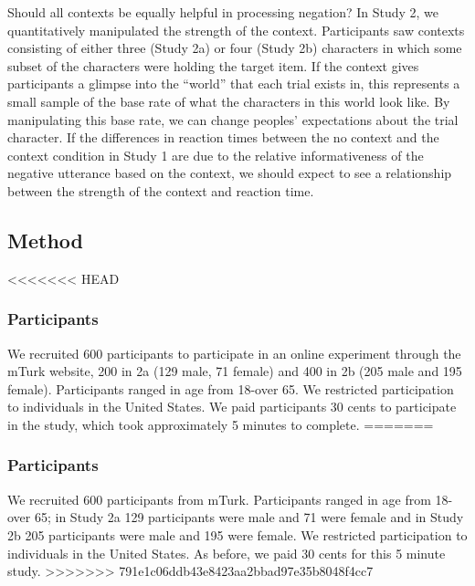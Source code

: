\documentclass[10pt,letterpaper]{article}
\begin{document}
Should all contexts be equally helpful in processing negation? 
In Study 2, we quantitatively manipulated the strength of the context.  Participants saw contexts consisting of either three (Study 2a) or four (Study 2b) characters in which some subset of the characters were holding the target item.  If the context gives participants a glimpse into the ``world'' that each trial exists in, this represents a small sample of the base rate of what the characters in this world look like.  By manipulating this base rate, we can change peoples' expectations about the trial character.  If the differences in reaction times between the no context and the context condition in Study 1 are due to the relative informativeness of the negative utterance based on the context, we should expect to see a relationship between the strength of the context and reaction time. 

\subsection{Method}

<<<<<<< HEAD
\subsubsection{Participants } 
We recruited 600 participants to participate in an online experiment through the mTurk website, 200 in 2a (129 male, 71 female) and  400 in 2b (205 male and 195 female). Participants ranged in age from 18-over 65.  We restricted participation to individuals in the United States. We paid participants 30 cents to participate in the study, which took approximately 5 minutes to complete.  
=======
\subsubsection{Participants} 

We recruited 600 participants from mTurk. Participants ranged in age from 18-over 65; in Study 2a 129 participants were male and 71 were female and in Study 2b 205 participants were male and 195 were female.  We restricted participation to individuals in the United States. As before, we paid 30 cents for this 5 minute study.  
>>>>>>> 791e1c06ddb43e8423aa2bbad97e35b8048f4cc7
\end{document}
